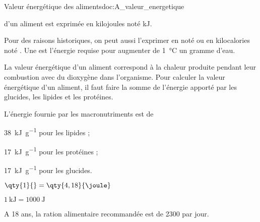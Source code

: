 \newpage
\vspace*{-36pt}
\begin{doc}{Valeur énergétique des aliments}{doc:A_valeur_energetique}
  \begin{importants}  
     d'un aliment est exprimée en kilojoules noté \unit{\kilo\joule}.
  \end{importants}
  Pour des raisons historiques, on peut aussi l'exprimer en  noté \unit{\cal} ou en kilocalories noté \unit{\kcal}.
  Une  est l'énergie requise pour augmenter de \qty{1}{\degreeCelsius} un gramme d'eau.

  La valeur énergétique d'un aliment correspond à la chaleur produite pendant leur combustion avec du dioxygène dans l'organisme.
  Pour calculer la valeur énergétique d'un aliment, il faut faire la somme de l'énergie apporté par les glucides, les lipides et les protéines.
  
  \begin{importants}
    L'énergie fournie par les macronutriments est de
    \begin{listePoints}[2]
      \item \qty{38}{\kilo\joule\per\g} pour les lipides ;
      \item \qty{17}{\kilo\joule\per\g} pour les protéines ;
      \item \qty{17}{\kilo\joule\per\g} pour les glucides.
    \end{listePoints}
  \end{importants}

  \begin{donnees}[2]
    \item $\qty{1}{\cal} = \qty{4,18}{\joule}$
    \item $\qty{1}{\kilo\joule} = \qty{1000}{\joule}$
    \item A 18 ans, la ration alimentaire recommandée est de \qty{2300}{\kcal} par jour.
  \end{donnees}
\end{doc}

